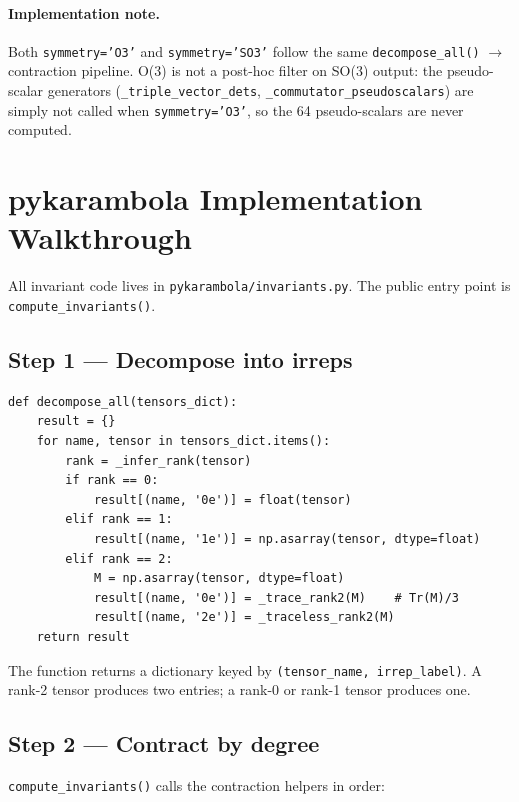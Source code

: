 \documentclass[11pt,a4paper]{article}
\begin{document}
\paragraph{Implementation note.}
Both \texttt{symmetry='O3'} and \texttt{symmetry='SO3'} follow the same
\texttt{decompose\_all()} $\to$ contraction pipeline.
O(3) is not a post-hoc filter on SO(3) output: the pseudo-scalar generators
(\texttt{\_triple\_vector\_dets}, \texttt{\_commutator\_pseudoscalars}) are
simply not called when \texttt{symmetry='O3'}, so the 64 pseudo-scalars are
never computed.

\section{pykarambola Implementation Walkthrough}
\label{sec:walkthrough}

All invariant code lives in \texttt{pykarambola/invariants.py}.
The public entry point is \texttt{compute\_invariants()}.

\subsection*{Step 1 — Decompose into irreps}

\begin{lstlisting}
def decompose_all(tensors_dict):
    result = {}
    for name, tensor in tensors_dict.items():
        rank = _infer_rank(tensor)
        if rank == 0:
            result[(name, '0e')] = float(tensor)
        elif rank == 1:
            result[(name, '1e')] = np.asarray(tensor, dtype=float)
        elif rank == 2:
            M = np.asarray(tensor, dtype=float)
            result[(name, '0e')] = _trace_rank2(M)    # Tr(M)/3
            result[(name, '2e')] = _traceless_rank2(M)
    return result
\end{lstlisting}

The function returns a dictionary keyed by \texttt{(tensor\_name, irrep\_label)}.
A rank-2 tensor produces two entries; a rank-0 or rank-1 tensor produces one.

\subsection*{Step 2 — Contract by degree}

\texttt{compute\_invariants()} calls the contraction helpers in order:
\end{document}
